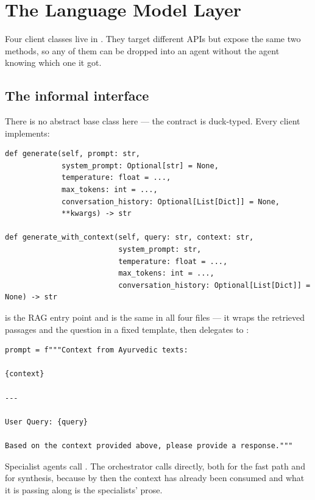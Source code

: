 \chapter{The Language Model Layer}

Four client classes live in . They target different APIs but expose the same two methods, so any of them can be dropped into an agent without the agent knowing which one it got.

\section{The informal interface}

There is no abstract base class here --- the contract is duck-typed. Every client implements:

\begin{lstlisting}[style=py]
def generate(self, prompt: str,
             system_prompt: Optional[str] = None,
             temperature: float = ...,
             max_tokens: int = ...,
             conversation_history: Optional[List[Dict]] = None,
             **kwargs) -> str

def generate_with_context(self, query: str, context: str,
                          system_prompt: str,
                          temperature: float = ...,
                          max_tokens: int = ...,
                          conversation_history: Optional[List[Dict]] = None) -> str
\end{lstlisting}

 is the RAG entry point and is the same in all four files --- it wraps the retrieved passages and the question in a fixed template, then delegates to :

\begin{lstlisting}[style=py]
        prompt = f"""Context from Ayurvedic texts:

{context}

---

User Query: {query}

Based on the context provided above, please provide a response."""
\end{lstlisting}

Specialist agents call . The orchestrator calls  directly, both for the fast path and for synthesis, because by then the context has already been consumed and what it is passing along is the specialists' prose.

